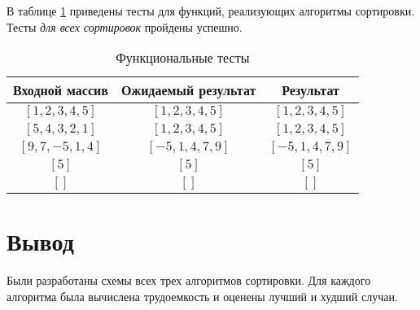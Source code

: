В таблице \ref{tbl:functional_test} приведены тесты для функций, реализующих алгоритмы сортировки. Тесты \textit{для всех сортировок} пройдены успешно.


\begin{table}[h]
	\begin{center}
		\begin{threeparttable}
		\captionsetup{justification=raggedleft,singlelinecheck=off}
		\caption{\label{tbl:functional_test} Функциональные тесты}
		\begin{tabular}{|c|c|c|}
			\hline
			Входной массив & Ожидаемый результат & Результат \\ 
			\hline
			$[1, 2, 3, 4, 5]$ & $[1, 2, 3, 4, 5]$  & $[1, 2, 3, 4, 5]$\\
			$[5, 4, 3, 2, 1]$  & $[1, 2, 3, 4, 5]$ & $[1, 2, 3, 4, 5]$\\
			$[9, 7, -5, 1, 4]$  & $[-5, 1, 4, 7, 9]$  & $[-5, 1, 4, 7, 9]$\\
			$[5]$  & $[5]$  & $[5]$\\
			$[]$  & $[]$  & $[]$\\
			\hline
		\end{tabular}
    \end{threeparttable}
	\end{center}
\end{table}


\section*{Вывод}

Были разработаны схемы всех трех алгоритмов сортировки. Для каждого алгоритма была вычислена трудоемкость и оценены лучший и худший случаи.
